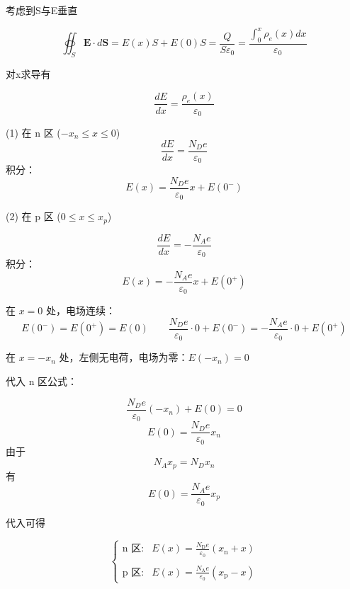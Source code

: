 \documentclass{article}
\begin{document}
考虑到S与E垂直

$$\oiint_S \mathbf{E} \cdot d\mathbf{S}=E(x)S+E(0)S=\frac{Q}{S\varepsilon_0}=\frac{\int_{0}^{x}\rho_e(x)dx}{\varepsilon_0}$$

对x求导有

$$\frac{dE}{dx}=\frac{\rho_e(x)}{\varepsilon_0}$$

\vspace{1em}
\begin{minipage}[b]{0.4\linewidth}
(1) 在 n 区 ($-x_n \le x \le 0$)
$$\frac{dE}{dx} = \frac{N_D e}{\varepsilon_0}$$
积分：
$$E(x) = \frac{N_D e}{\varepsilon_0} x + E(0^-)$$
\end{minipage}
\hfill
\begin{minipage}[b]{0.5\linewidth}
(2) 在 p 区 ($0 \le x \le x_p$)

$$\frac{dE}{dx} = -\frac{N_A e}{\varepsilon_0}$$
积分：
$$E(x) = -\frac{N_A e}{\varepsilon_0} x + E(0^+)$$
\end{minipage}

\newpage

在 $x = 0$ 处，电场连续：
$$E(0^-) = E(0^+)=E(0)\qquad\frac{N_D e}{\varepsilon_0} \cdot 0 + E(0^-) = -\frac{N_A e}{\varepsilon_0} \cdot 0 + E(0^+)$$

在 $x = -x_n$ 处，左侧无电荷，电场为零：$E(-x_n) = 0$

代入 n 区公式：

$$\frac{N_D e}{\varepsilon_0} (-x_n) + E(0) = 0$$
$$E(0)= \frac{N_D e}{\varepsilon_0} x_n$$
由于
$$N_A x_p = N_D x_n$$
有
$$E(0)= \frac{N_A e}{\varepsilon_0} x_p$$

代入可得

$$\begin{cases}\text{n 区:}&E(x)=\frac{N_\mathrm{D}e}{\varepsilon_0}(x_\mathrm{n}+x)\\\\\text{p 区:}&E(x)=\frac{N_\mathrm{A}e}{\varepsilon_0}(x_\mathrm{p}-x)\end{cases}$$
\end{document}
